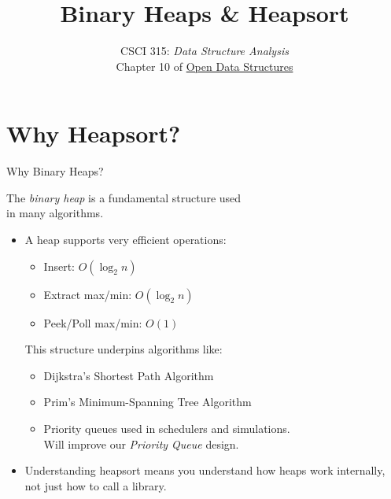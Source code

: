 \documentclass[14pt,aspectratio=1610]{beamer}
\title{\Huge{} Binary Heaps \& Heapsort}
\subtitle{CSCI 315: \textit{Data Structure Analysis}\\Chapter 10 of \href{https://opendatastructures.org/ods-cpp.pdf}{Open Data Structures}}
\institute{Charleston Southern University}
\begin{document}
\begin{frame}
  \titlepage{}
\end{frame}

\section*{Why Heapsort?}

\begin{frame}{Why Binary Heaps?}

The \emph{binary heap} is a fundamental structure used\\ in many algorithms.

\begin{itemize}

  \item  A heap supports very efficient operations:

  \begin{itemize}
    \item Insert: \(O(\log_2{n})\)

    \item Extract max/min: \(O(\log_2{n})\)

    \item Peek/Poll max/min: \(O(1)\)
  \end{itemize}

  This structure underpins algorithms like:

  \begin{itemize}
    \item Dijkstra's Shortest Path Algorithm

    \item Prim's Minimum-Spanning Tree Algorithm

    \item Priority queues used in schedulers and simulations.\\
      Will improve our \emph{Priority Queue} design.
  \end{itemize}

  \item Understanding heapsort means you understand how heaps work internally, not just how to call a library.
\end{itemize}
\end{frame}
\end{document}
